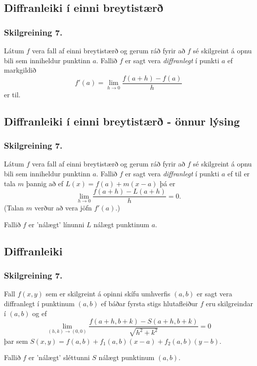 \subsection{Diffranleiki í einni breytistærð} 

\subsubsection{Skilgreining 7. }
  Látum $f$ vera fall af einni breytistærð og gerum ráð fyrir að $f$ sé
skilgreint á opnu bili sem inniheldur punktinn $a$.  Fallið $f$ er
sagt vera {\em diffranlegt} í punkti $a$ ef markgildið
$$f'(a)=\lim_{h\rightarrow 0}\frac{f(a+h)-f(a)}{h}$$
er til.



\subsection{Diffranleiki í einni breytistærð - önnur lýsing} 

\subsubsection{Skilgreining 7. }
Látum $f$ vera fall af einni breytistærð og gerum ráð fyrir að $f$ sé
skilgreint á opnu bili sem inniheldur punktinn $a$.  Fallið $f$ er
sagt vera {\em diffranlegt} í punkti $a$ ef til er tala $m$ þannig að
ef $L(x)=f(a)+m(x-a)$ þá er 
$$\lim_{h\rightarrow 0}\frac{f(a+h)-L(a+h)}{h}=0.$$
(Talan $m$ verður að vera jöfn $f'(a)$.)


\bigskip
Fallið $f$ er 'nálægt' línunni $L$ nálægt punktinum $a$.


\subsection{Diffranleiki} 

\subsubsection{Skilgreining 7.}
Fall $f(x,y)$ sem er skilgreint á opinni
skífu umhverfis $(a,b)$ er sagt vera diffranlegt í punktinum $(a,b)$
ef báðar fyrsta stigs hlutafleiður $f$ eru skilgreindar í $(a,b)$ og ef 
$$\lim_{(h,k)\rightarrow (0,0)}
\frac{f(a+h, b+k)-S(a+h,b+k)}{\sqrt{h^2+k^2}}=0$$
þar sem $S(x,y) = f(a,b) + f_1(a,b)(x-a)+f_2(a,b)(y-b)$.

\bigskip
Fallið $f$ er 'nálægt' sléttunni $S$ nálægt punktinum $(a,b)$.


